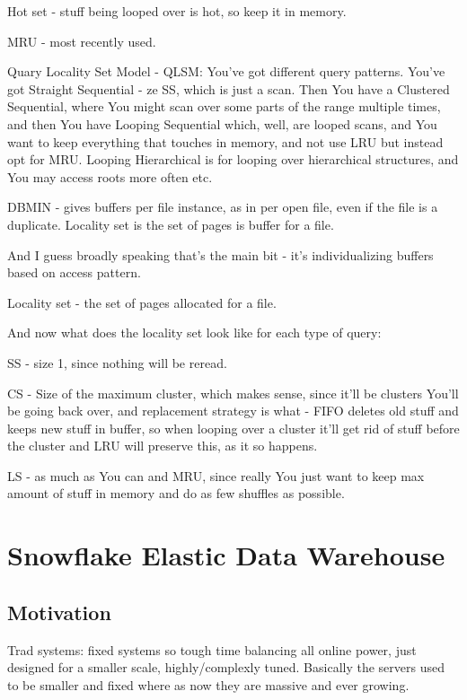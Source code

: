 \documentclass{article}
\begin{document}
	Hot set - stuff being looped over is hot, so keep it in memory.
	
	MRU - most recently used.
	
	Quary Locality Set Model - QLSM: You've got different query patterns. You've got Straight Sequential - ze SS, which is just a scan. Then You have a Clustered Sequential, where You might scan over some parts of the range multiple times, and then You have Looping Sequential which, well, are looped scans, and You want to keep everything that touches in memory, and not use LRU but instead opt for MRU. Looping Hierarchical is for looping over hierarchical structures, and You may access roots more often etc.
	
	DBMIN - gives buffers per file instance, as in per open file, even if the file is a duplicate. Locality set is the set of pages is buffer for a file.
	
	And I guess broadly speaking that's the main bit - it's individualizing buffers based on access pattern.
	
	Locality set - the set of pages allocated for a file.
	
	And now what does the locality set look like for each type of query:
	
	SS - size 1, since nothing will be reread.
	
	CS - Size of the maximum cluster, which makes sense, since it'll be clusters You'll be going back over, and replacement strategy is what - FIFO deletes old stuff and keeps new stuff in buffer, so when looping over a cluster it'll get rid of stuff before the cluster and LRU will preserve this, as it so happens.
	
	LS - as much as You can and MRU, since really You just want to keep max amount of stuff in memory and do as few shuffles as possible.
	
	
	
	
	
	

\section{Snowflake Elastic Data Warehouse}

	\subsection{Motivation}
		Trad systems: fixed systems so tough time balancing all online power, just designed for a smaller scale, highly/complexly tuned. 
		Basically the servers used to be smaller and fixed where as now  they are massive and ever growing.
		
\end{document}
